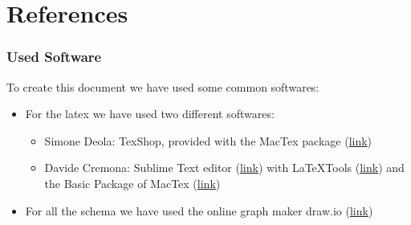 \documentclass[../../dd.tex]{subfiles}
\begin{document}
	\chapter{References}
		\subsection{Used Software}
		To create this document we have used some common softwares:
		\begin{itemize}
			\item For the latex we have used two different softwares:
			\begin{itemize}
			
			\item Simone Deola: TexShop, provided with the MacTex package 					(\href{https://tug.org/mactex/}{link})
			
		\item Davide Cremona: Sublime Text editor (\href{http://www.sublimetext.com}{link}) with LaTeXTools (\href{https://github.com/SublimeText/LaTeXTools}{link}) and the Basic Package of MacTex (\href{https://tug.org/mactex/}{link})

			\end{itemize}
			
			\item For all the schema we have used the online graph maker draw.io (\href{https://www.draw.io}{link})
		\end{itemize}
		
\end{document}
